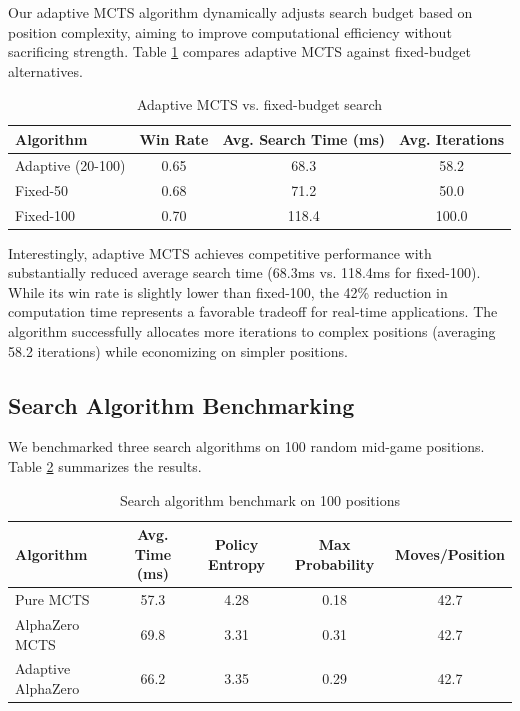 \documentclass{article}
\begin{document}
Our adaptive MCTS algorithm dynamically adjusts search budget based on position complexity, aiming to improve computational efficiency without sacrificing strength. Table \ref{tab:adaptive} compares adaptive MCTS against fixed-budget alternatives.

\begin{table}[h]
\centering
\caption{Adaptive MCTS vs. fixed-budget search}
\label{tab:adaptive}
\begin{tabular}{lccc}
\toprule
Algorithm & Win Rate & Avg. Search Time (ms) & Avg. Iterations \\
\midrule
Adaptive (20-100) & 0.65 & 68.3 & 58.2 \\
Fixed-50 & 0.68 & 71.2 & 50.0 \\
Fixed-100 & 0.70 & 118.4 & 100.0 \\
\bottomrule
\end{tabular}
\end{table}

Interestingly, adaptive MCTS achieves competitive performance with substantially reduced average search time (68.3ms vs. 118.4ms for fixed-100). While its win rate is slightly lower than fixed-100, the 42\% reduction in computation time represents a favorable tradeoff for real-time applications. The algorithm successfully allocates more iterations to complex positions (averaging 58.2 iterations) while economizing on simpler positions.

\subsection{Search Algorithm Benchmarking}

We benchmarked three search algorithms on 100 random mid-game positions. Table \ref{tab:benchmark} summarizes the results.

\begin{table}[h]
\centering
\caption{Search algorithm benchmark on 100 positions}
\label{tab:benchmark}
\begin{tabular}{lcccc}
\toprule
Algorithm & Avg. Time (ms) & Policy Entropy & Max Probability & Moves/Position \\
\midrule
Pure MCTS & 57.3 & 4.28 & 0.18 & 42.7 \\
AlphaZero MCTS & 69.8 & 3.31 & 0.31 & 42.7 \\
Adaptive AlphaZero & 66.2 & 3.35 & 0.29 & 42.7 \\
\bottomrule
\end{tabular}
\end{table}
\end{document}
